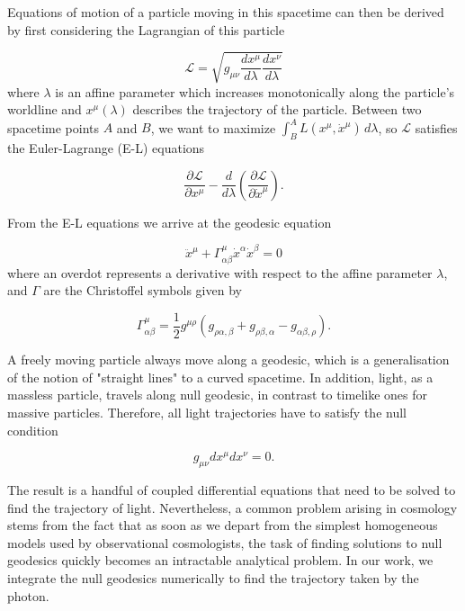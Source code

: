Equations of motion of a particle moving in this spacetime can then be derived by first considering the Lagrangian of this particle

\begin{equation}
  \mathcal{L} = \sqrt{g_{\mu \nu} \frac{dx^{\mu}}{d \lambda} \frac{dx^{\nu}}{d \lambda}}
\end{equation}
where $\lambda$ is an affine parameter which increases monotonically along the particle's worldline and $x^{\mu}(\lambda)$ describes the trajectory of the particle. Between two spacetime points $A$ and $B$, we want to maximize $\int^{A}_{B} L(x^{\mu}, \dot{x}^{\mu})\, d \lambda$, so $\mathcal{L}$ satisfies the Euler-Lagrange (E-L) equations

\begin{equation}
  \frac{\partial \mathcal{L}}{\partial x^{\mu}} - \frac{d}{d \lambda}\left ( \frac{\partial \mathcal{L}}{\partial \dot{x}^{\mu}} \right ).
  \label{eq:euler-lagrange-eqn}
\end{equation}

From the E-L equations we arrive at the geodesic equation

\begin{equation}
  \ddot{x}^{\mu} + \Gamma^{\mu}_{\alpha \beta} \dot{x}^{\alpha} \dot{x}^{\beta} = 0 
  \label{eq:geodesic-eqn}
\end{equation}
where an overdot represents a derivative with respect to the affine parameter $\lambda$, and $\Gamma$ are the Christoffel symbols given by

\begin{equation}
  \Gamma^{\mu}_{\alpha \beta} = \frac{1}{2} g^{\mu \rho} (g_{\rho \alpha, \beta} + g_{\rho \beta, \alpha} - g_{\alpha \beta, \rho}).
  \label{eq:christoffels}
\end{equation}

A freely moving particle always move along a geodesic, which is a generalisation of the notion of "straight lines" to a curved spacetime. In addition, light, as a massless particle, travels along null geodesic, in contrast to timelike ones for massive particles. Therefore, all light trajectories have to satisfy the null condition

\begin{equation}
  g_{\mu \nu} dx^{\mu} dx^{\nu} = 0.
  \label{eq:null-condition}
\end{equation}

The result is a handful of coupled differential equations that need to be solved to find the trajectory of light. Nevertheless, a common problem arising in cosmology stems from the fact that as soon as we depart from the simplest homogeneous models used by observational cosmologists, the task of finding solutions to null geodesics quickly becomes an intractable analytical problem. In our work, we integrate the null geodesics numerically to find the trajectory taken by the photon. 


